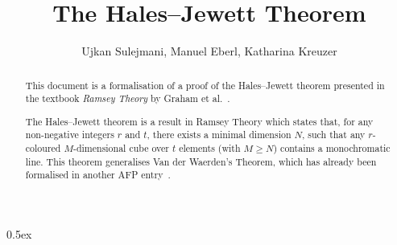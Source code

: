 \documentclass[11pt,a4paper]{article}
\begin{document}
\title{The Hales--Jewett Theorem}
\author{Ujkan Sulejmani, Manuel Eberl, Katharina Kreuzer}
\maketitle

\begin{abstract}
    This document is a formalisation of a proof of the Hales--Jewett theorem presented in the textbook \emph{Ramsey Theory} by Graham et al.~\cite{thebook}.
    
    The Hales--Jewett theorem is a result in Ramsey Theory which states that, for any non-negative integers $r$ and $t$, there exists a minimal dimension $N$, such that any $r$-coloured $M$-dimensional cube over $t$ elements (with $M \geq N$) contains a monochromatic line. This theorem generalises Van der Waerden's Theorem, which has already been formalised in another AFP entry~\cite{vdw}.
\end{abstract}


\newpage
\tableofcontents

\newpage
\parindent 0pt\parskip 0.5ex



\nocite{vdw}


\end{document}
